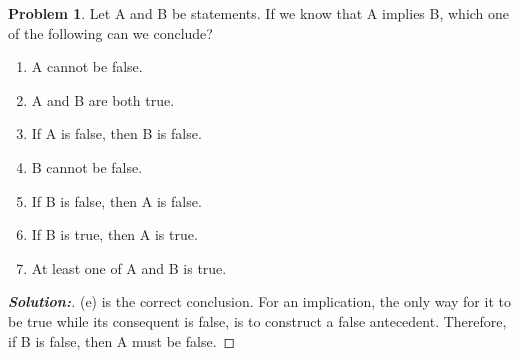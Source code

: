 \documentclass[12pt]{article}
\theoremstyle{definition}\newtheorem{problem}{Problem}
\newenvironment{solution}{\begin{proof}[\bfseries\textup{Solution:}]}{\end{proof}}
\begin{document}
%
\newpage
\begin{problem}
Let A and B be statements.  If we know that A implies B, which one of the following can we conclude?
\begin{enumerate}
\item A cannot be false.
\item A and B are both true.
\item If A is false, then B is false.
\item B cannot be false.
\item If B is false, then A is false.
\item If B is true, then A is true.
\item At least one of A and B is true.
\end{enumerate}
\end{problem}
\begin{solution} \quad \newline

    (e) is the correct conclusion. For an implication, the only way for it to be true while its consequent is false, is to construct a false antecedent. Therefore, if B is false, then A must be false.

\end{solution}
\end{document}
